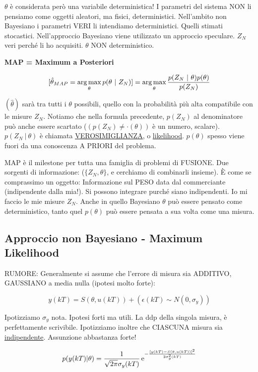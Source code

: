 $\theta$ è considerata però una variabile deterministica! I parametri del sistema NON li pensiamo come oggetti aleatori, ma fisici, deterministici. Nell'ambito non Bayesiano i parametri VERI li intendiamo deterministici. Quelli stimati stocastici. Nell'approccio Bayesiano viene utilizzato un approccio speculare. $Z_N$ veri perché li ho acquisiti. $\theta$ NON deterministico. 

\begin{defn}{\textbf{MAP = Maximum a Posteriori}}

\[
	[\hat{\theta}_{MAP} = \argmax_\theta{p(\theta\ |\ Z_N)}] = \argmax_\theta{\frac{p(Z_N\ |\ \theta)p(\theta)}{p(Z_N)}}
\]

\end{defn}

$(\hat{\theta})$ sarà tra tutti i $\theta$ possibili, quello con la probabilità più alta compatibile con le misure $Z_N$. Notiamo che nella formula precedente, $p(Z_N)$ al denominatore può anche essere scartato ($(p(Z_N) \neq\mathord{\cdot}(\theta))$ è un numero, scalare). $p(Z_N\ |\ \theta)$ è chiamata \underline{\underline{VEROSIMIGLIANZA}}, o \underline{likelihood}. $p(\theta)$ spesso viene fuori da una conoscenza A PRIORI del problema. 

MAP è il milestone per tutta una famiglia di problemi di FUSIONE. Due sorgenti di informazione: ($\{Z_N,\theta\}$, e cerchiamo di combinarli insieme). \`E come se comprassimo un oggetto: Informazione sul PESO data dal commerciante (indipendente dalla mia!). Si possono integrare purché siano indipendenti. Io mi faccio le mie misure $Z_N$. Anche in quello Bayesiano $\theta$ può essere pensato come deterministico, tanto quel $p(\theta)$ può essere pensata a sua volta come una misura.

\subsection{Approccio non Bayesiano - Maximum Likelihood}

RUMORE: Generalmente si assume che l'errore di misura sia ADDITIVO, GAUSSIANO a media nulla (ipotesi molto forte):

\[
	y(kT) = S(\theta,u(kT)) + (\epsilon(kT) \sim N(0,\sigma_y))
\]

Ipotizziamo $\sigma_y$ nota. Ipotesi forti ma utili. La ddp della singola misura, è perfettamente scrivibile. Ipotizziamo inoltre che CIASCUNA misura sia \underline{indipendente}. Assunzione abbastanza forte!

\[
	p(y(kT)|\theta) = \frac{1}{\sqrt{2\pi}\sigma_y(kT)}\mathop{}\!\mathrm{e}^{-\frac{[y(kT)-S(\theta,u(kT))]^2}{2\sigma_y^2(kT)}}
\]

